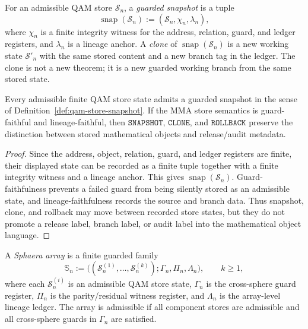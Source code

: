\begin{definition}\label{def:qam-store-snapshot}
For an admissible QAM store \(\mathcal S_n\), a \emph{guarded snapshot} is a tuple
\[
  \operatorname{snap}(\mathcal S_n)
  :=
  (\mathcal S_n,\chi_n,\lambda_n),
\]
where \(\chi_n\) is a finite integrity witness for the address, relation, guard, and ledger registers, and \(\lambda_n\) is a lineage anchor. A \emph{clone} of \(\operatorname{snap}(\mathcal S_n)\) is a new working state \(\mathcal S'_n\) with the same stored content and a new branch tag in the ledger. The clone is not a new theorem; it is a new guarded working branch from the same stored state.
\end{definition}

\begin{proposition}\label{prop:qam-store-snapshot-stability}
Every admissible finite QAM store state admits a guarded snapshot in the sense of Definition~\ref{def:qam-store-snapshot}. If the MMA store semantics is guard-faithful and lineage-faithful, then \(\texttt{SNAPSHOT}\), \(\texttt{CLONE}\), and \(\texttt{ROLLBACK}\) preserve the distinction between stored mathematical objects and release/audit metadata.
\end{proposition}

\begin{proof}
Since the address, object, relation, guard, and ledger registers are finite, their displayed state can be recorded as a finite tuple together with a finite integrity witness and a lineage anchor. This gives \(\operatorname{snap}(\mathcal S_n)\). Guard-faithfulness prevents a failed guard from being silently stored as an admissible state, and lineage-faithfulness records the source and branch data. Thus snapshot, clone, and rollback may move between recorded store states, but they do not promote a release label, branch label, or audit label into the mathematical object language.
\end{proof}

\begin{definition}\label{def:sphaera-array}
A \emph{Sphaera array} is a finite guarded family
\[
  \mathbb S_n
  :=
  \bigl((\mathcal S_n^{(1)},\ldots,\mathcal S_n^{(k)});\Gamma_n,\Pi_n,\Lambda_n\bigr),
  \qquad k\ge 1,
\]
where each \(\mathcal S_n^{(i)}\) is an admissible QAM store state, \(\Gamma_n\) is the cross-sphere guard register, \(\Pi_n\) is the parity/residual witness register, and \(\Lambda_n\) is the array-level lineage ledger. The array is admissible if all component stores are admissible and all cross-sphere guards in \(\Gamma_n\) are satisfied.
\end{definition}

